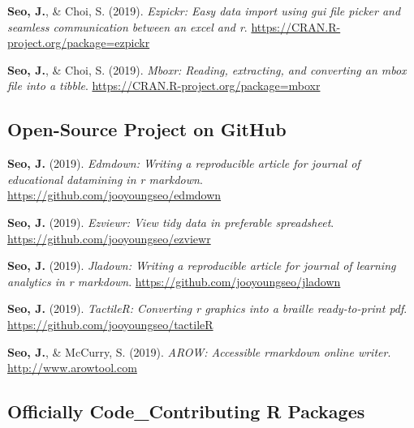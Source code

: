 \documentclass[11pt, a4paper]{awesome-cv}
\begin{document}
\leavevmode\hypertarget{ref-R-ezpickr}{}%
\textbf{Seo, J.}, \& Choi, S. (2019). \emph{Ezpickr: Easy data import
using gui file picker and seamless communication between an excel and
r}. \url{https://CRAN.R-project.org/package=ezpickr}

\leavevmode\hypertarget{ref-R-mboxr}{}%
\textbf{Seo, J.}, \& Choi, S. (2019). \emph{Mboxr: Reading, extracting,
and converting an mbox file into a tibble}.
\url{https://CRAN.R-project.org/package=mboxr}

\endgroup

\hypertarget{open-source-project-on-github}{%
\subsection{Open-Source Project on
GitHub}\label{open-source-project-on-github}}

\begingroup
\setlength{\parindent}{-0.5in}
\setlength{\leftskip}{0.5in}

\hypertarget{refs_github_projects}{}
\leavevmode\hypertarget{ref-R-edmdown}{}%
\textbf{Seo, J.} (2019). \emph{Edmdown: Writing a reproducible article
for journal of educational datamining in r markdown}.
\url{https://github.com/jooyoungseo/edmdown}

\leavevmode\hypertarget{ref-R-ezviewr}{}%
\textbf{Seo, J.} (2019). \emph{Ezviewr: View tidy data in preferable
spreadsheet}. \url{https://github.com/jooyoungseo/ezviewr}

\leavevmode\hypertarget{ref-R-jladown}{}%
\textbf{Seo, J.} (2019). \emph{Jladown: Writing a reproducible article
for journal of learning analytics in r markdown}.
\url{https://github.com/jooyoungseo/jladown}

\leavevmode\hypertarget{ref-R-tactileR}{}%
\textbf{Seo, J.} (2019). \emph{TactileR: Converting r graphics into a
braille ready-to-print pdf}.
\url{https://github.com/jooyoungseo/tactileR}

\leavevmode\hypertarget{ref-webrender}{}%
\textbf{Seo, J.}, \& McCurry, S. (2019). \emph{AROW: Accessible
rmarkdown online writer}. \url{http://www.arowtool.com}

\endgroup

\hypertarget{officially-code_contributing-r-packages}{%
\subsection{Officially Code\_Contributing R
Packages}\label{officially-code_contributing-r-packages}}
\end{document}
